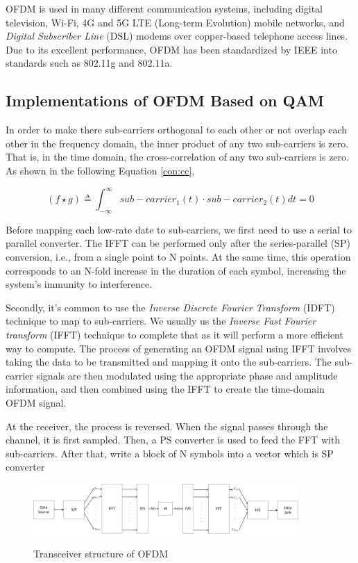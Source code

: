 \documentclass{article}
\begin{document}
OFDM is used in many different communication systems, including digital television, Wi-Fi, 4G and 5G LTE (Long-term Evolution) mobile networks, and \textit{Digital Subscriber Line} (DSL) modems over copper-based telephone access lines. Due to its excellent performance, OFDM has been standardized by IEEE into standards such as 802.11g and 802.11a\cite{RN79}.

\subsection{Implementations of OFDM Based on QAM}
In order to make there sub-carriers orthogonal to each other or not overlap each other in the frequency domain, the inner product of any two sub-carriers is zero. That is, in the time domain, the cross-correlation of any two sub-carriers is zero. As shown in the following Equation \ref{con:cc},

\begin{equation}
(f \star g) \triangleq \int_{-\infty}^{\infty} sub-carrier_1(t) \cdot sub-carrier_2(t)dt=0 \label{con:cc}
\end{equation}

Before mapping each low-rate date to sub-carriers, we first need to use a serial to parallel converter. The IFFT can be performed only after the series-parallel (SP) conversion, i.e., from a single point to N points. At the same time, this operation corresponds to an N-fold increase in the duration of each symbol, increasing the system's immunity to interference.

Secondly, it's common to use the \textit{Inverse Discrete Fourier Transform} (IDFT) technique to map to sub-carriers. We usually us the \textit{Inverse Fast Fourier transform} (IFFT) technique to complete that as it will perform a more efficient way to compute. The process of generating an OFDM signal using IFFT involves taking the data to be transmitted and mapping it onto the sub-carriers. The sub-carrier signals are then modulated using the appropriate phase and amplitude information, and then combined using the IFFT to create the time-domain OFDM signal. 

At the receiver, the process is reversed. When the signal passes through the channel, it is first sampled. Then, a PS converter is used to feed the FFT with sub-carriers. After that, write a block of N symbols into a vector which is SP converter

\begin{figure}[!ht]
  \centering
  \includegraphics[width=0.9\textwidth]{images/OFDM_transceiver.pdf}\\
  \caption{Transceiver structure of OFDM}
  \label{fig:env}
\end{figure}
\end{document}
